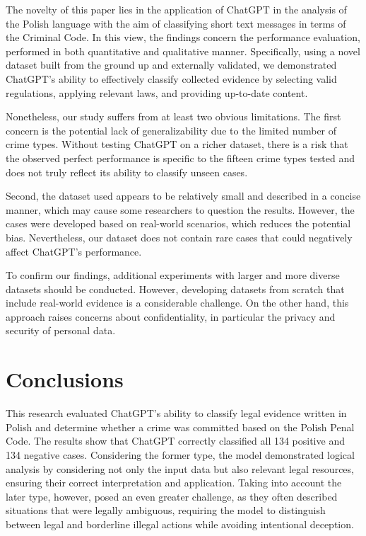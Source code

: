 \documentclass[preprint,12pt,number]{elsarticle}
\begin{document}
The novelty of this paper lies in the application of ChatGPT in the analysis of the Polish language with the aim of classifying short text messages in terms of the Criminal Code. In this view, the findings concern the performance evaluation, performed in both quantitative and qualitative manner. Specifically, using a novel dataset built from the ground up and externally validated, we demonstrated ChatGPT's ability to effectively classify collected evidence by selecting valid regulations, applying relevant laws, and providing up-to-date content.

Nonetheless, our study suffers from at least two obvious limitations. The first concern is the potential lack of generalizability due to the limited number of crime types. Without testing ChatGPT on a richer dataset, there is a risk that the observed perfect performance is specific to the fifteen crime types tested and does not truly reflect its ability to classify unseen cases. 

Second, the dataset used appears to be relatively small and described in a concise manner, which may cause some researchers to question the results. However, the cases were developed based on real-world scenarios, which reduces the potential bias. Nevertheless, our dataset does not contain rare cases that could negatively affect ChatGPT's performance.

To confirm our findings, additional experiments with larger and more diverse datasets should be conducted. However, developing datasets from scratch that include real-world evidence is a considerable challenge. On the other hand, this approach raises concerns about confidentiality, in particular the privacy and security of personal data. 

\section{Conclusions}
\label{sec:conclusions}
This research evaluated ChatGPT's ability to classify legal evidence written in Polish and determine whether a crime was committed based on the Polish Penal Code. The results show that ChatGPT correctly classified all 134 positive and 134 negative cases. Considering the former type, the model demonstrated logical analysis by considering not only the input data but also relevant legal resources, ensuring their correct interpretation and application. Taking into account the later type, however, posed an even greater challenge, as they often described situations that were legally ambiguous, requiring the model to distinguish between legal and borderline illegal actions while avoiding intentional deception.
\end{document}
